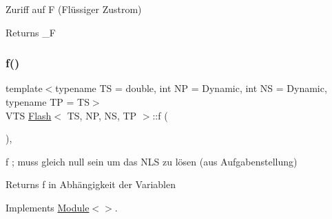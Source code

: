 Zuriff auf F (Flüssiger Zustrom) 

\begin{DoxyReturn}{Returns}
\+\_\+F 
\end{DoxyReturn}
\mbox{\label{class_flash_ad29e755877ca96aa5b9f34a10d6cd8b2}} 
\subsubsection{\texorpdfstring{f()}{f()}}
{\footnotesize\ttfamily template$<$typename TS = double, int NP = Dynamic, int NS = Dynamic, typename TP = TS$>$ \\
V\+TS \mbox{\hyperlink{class_flash}{Flash}}$<$ TS, NP, NS, TP $>$\+::f (\begin{DoxyParamCaption}{ }\end{DoxyParamCaption})\hspace{0.3cm}{\ttfamily [inline]}, {\ttfamily [virtual]}}



f ; muss gleich null sein um das N\+LS zu lösen (aus Aufgabenstellung) 

\begin{DoxyReturn}{Returns}
f in Abhängigkeit der Variablen 
\end{DoxyReturn}


Implements \mbox{\hyperlink{class_module_a2499211a4fc52bc33512761ea7fb3c62}{Module$<$$>$}}.

